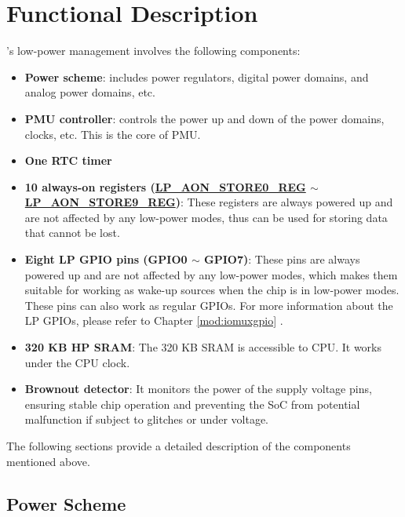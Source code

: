 \documentclass[main\_\_EN.tex]{subfiles}
\begin{document}
\section{Functional Description}

\chipname{}'s low-power management involves the following components:

\begin{itemize}
    \item \textbf{Power scheme}: includes power regulators, digital power domains, and analog power domains, etc.

    \item \textbf{PMU controller}: controls the power up and down of the power domains, clocks, etc. This is the core of PMU.

    \item \textbf{One RTC timer}

    \item \textbf{10 always-on registers (\hyperref[regdesc:LPAONSTORENREG]{LP\_AON\_STORE0\_REG} $\sim$ \hyperref[regdesc:LPAONSTORENREG]{LP\_AON\_STORE9\_REG})}: These registers are always powered up and are not affected by any low-power modes, thus can be used for storing data that cannot be lost.

    \item \textbf{Eight LP GPIO pins (GPIO0 $\sim$ GPIO7)}: These pins are always powered up and are not affected by any low-power modes, which makes them suitable for working as wake-up sources when the chip is in low-power modes. These pins can also work as regular GPIOs. For more information about the LP GPIOs, please refer to Chapter \ref{mod:iomuxgpio} \textit{}.

    \item \textbf{320 KB HP SRAM}: The 320 KB SRAM is accessible to CPU. It works under the CPU clock.

    \item \textbf{Brownout detector}: It monitors the power of the supply voltage pins, ensuring stable chip operation and preventing the SoC from potential malfunction if subject to glitches or under voltage.
\end{itemize}

The following sections provide a detailed description of the components mentioned above.

\subsection{Power Scheme}
\end{document}
